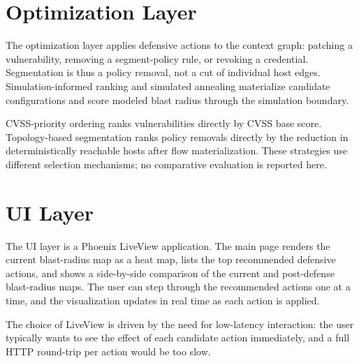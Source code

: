 \section{Optimization Layer}

The optimization layer applies defensive actions to the context graph: patching a vulnerability, removing a segment-policy rule, or revoking a credential. Segmentation is thus a policy removal, not a cut of individual host edges. Simulation-informed ranking and simulated annealing materialize candidate configurations and score modeled blast radius through the simulation boundary.

CVSS-priority ordering ranks vulnerabilities directly by CVSS base score. Topology-based segmentation ranks policy removals directly by the reduction in deterministically reachable hosts after flow materialization. These strategies use different selection mechanisms; no comparative evaluation is reported here.

\section{UI Layer}

The UI layer is a Phoenix LiveView application. The main page renders the current blast-radius map as a heat map, lists the top recommended defensive actions, and shows a side-by-side comparison of the current and post-defense blast-radius maps. The user can step through the recommended actions one at a time, and the visualization updates in real time as each action is applied.

The choice of LiveView is driven by the need for low-latency interaction: the user typically wants to see the effect of each candidate action immediately, and a full HTTP round-trip per action would be too slow.
